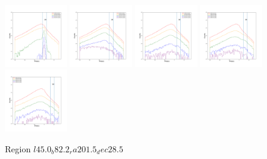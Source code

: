 \documentclass[12pt,prd]{article}
\begin{document}
\begin{figure}[h!]
\includegraphics[width=0.24\textwidth]{../figures/scanning_plotsgaiascan_l45_0_b82_2_ra201_5_dec28_5_npy_12.pdf}
\includegraphics[width=0.24\textwidth]{../figures/scanning_plotsgaiascan_l45_0_b82_2_ra201_5_dec28_5_npy_13.pdf}
\includegraphics[width=0.24\textwidth]{../figures/scanning_plotsgaiascan_l45_0_b82_2_ra201_5_dec28_5_npy_14.pdf}
\includegraphics[width=0.24\textwidth]{../figures/scanning_plotsgaiascan_l45_0_b82_2_ra201_5_dec28_5_npy_15.pdf}
\includegraphics[width=0.24\textwidth]{../figures/scanning_plotsgaiascan_l45_0_b82_2_ra201_5_dec28_5_npy_16.pdf}
\caption{Region $l45.0_b82.2_ra201.5_dec28.5$}
\end{figure}
\end{document}
